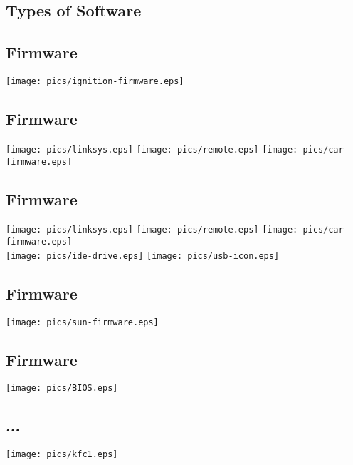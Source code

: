 \documentclass[xga]{xdvislides}
\begin{document}
\subsection{Types of Software}

\subsection{Firmware}
\begin{center}
	\texttt{[image: pics/ignition-firmware.eps]}
\end{center}

\subsection{Firmware}
\begin{center}
	\texttt{[image: pics/linksys.eps]}
	\texttt{[image: pics/remote.eps]}
	\texttt{[image: pics/car-firmware.eps]}
\end{center}

\subsection{Firmware}
\begin{center}
	\texttt{[image: pics/linksys.eps]}
	\texttt{[image: pics/remote.eps]}
	\texttt{[image: pics/car-firmware.eps]} \\
	\texttt{[image: pics/ide-drive.eps]}
	\texttt{[image: pics/usb-icon.eps]}
\end{center}



\subsection{Firmware}
\begin{center}
	\texttt{[image: pics/sun-firmware.eps]}
\end{center}

\subsection{Firmware}
\begin{center}
	\texttt{[image: pics/BIOS.eps]}
\end{center}

\subsection{...}
\begin{center}
	\texttt{[image: pics/kfc1.eps]}
\end{center}
\end{document}
